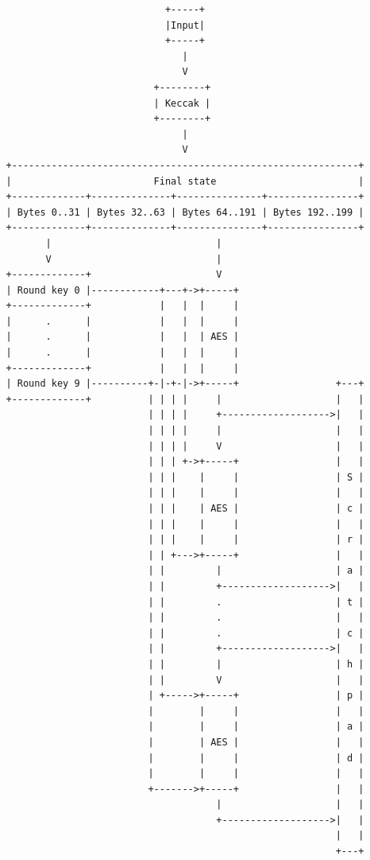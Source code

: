 \documentclass[
]{article}
\begin{document}
\begin{verbatim}
                               +-----+
                               |Input|
                               +-----+
                                  |
                                  V
                             +--------+
                             | Keccak |
                             +--------+
                                  |
                                  V
   +-------------------------------------------------------------+
   |                         Final state                         |
   +-------------+--------------+---------------+----------------+
   | Bytes 0..31 | Bytes 32..63 | Bytes 64..191 | Bytes 192..199 |
   +-------------+--------------+---------------+----------------+
          |                             |
          V                             |
   +-------------+                      V
   | Round key 0 |------------+---+->+-----+
   +-------------+            |   |  |     |
   |      .      |            |   |  |     |
   |      .      |            |   |  | AES |
   |      .      |            |   |  |     |
   +-------------+            |   |  |     |
   | Round key 9 |----------+-|-+-|->+-----+                 +---+
   +-------------+          | | | |     |                    |   |
                            | | | |     +------------------->|   |
                            | | | |     |                    |   |
                            | | | |     V                    |   |
                            | | | +->+-----+                 |   |
                            | | |    |     |                 | S |
                            | | |    |     |                 |   |
                            | | |    | AES |                 | c |
                            | | |    |     |                 |   |
                            | | |    |     |                 | r |
                            | | +--->+-----+                 |   |
                            | |         |                    | a |
                            | |         +------------------->|   |
                            | |         .                    | t |
                            | |         .                    |   |
                            | |         .                    | c |
                            | |         +------------------->|   |
                            | |         |                    | h |
                            | |         V                    |   |
                            | +----->+-----+                 | p |
                            |        |     |                 |   |
                            |        |     |                 | a |
                            |        | AES |                 |   |
                            |        |     |                 | d |
                            |        |     |                 |   |
                            +------->+-----+                 |   |
                                        |                    |   |
                                        +------------------->|   |
                                                             |   |
                                                             +---+
\end{verbatim}
\end{document}

